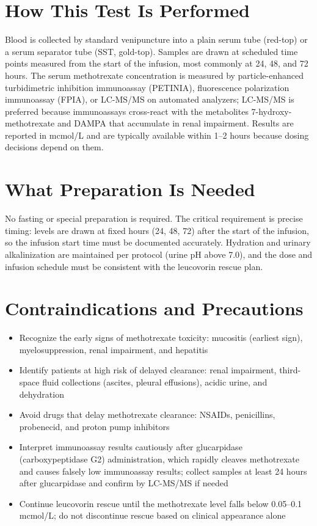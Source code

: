 \section*{How This Test Is Performed}
Blood is collected by standard venipuncture into a plain serum tube (red-top) or a serum separator tube (SST, gold-top). Samples are drawn at scheduled time points measured from the start of the infusion, most commonly at 24, 48, and 72 hours. The serum methotrexate concentration is measured by particle-enhanced turbidimetric inhibition immunoassay (PETINIA), fluorescence polarization immunoassay (FPIA), or LC-MS/MS on automated analyzers; LC-MS/MS is preferred because immunoassays cross-react with the metabolites 7-hydroxy-methotrexate and DAMPA that accumulate in renal impairment. Results are reported in mcmol/L and are typically available within 1--2 hours because dosing decisions depend on them.
\section*{What Preparation Is Needed}
No fasting or special preparation is required. The critical requirement is precise timing: levels are drawn at fixed hours (24, 48, 72) after the start of the infusion, so the infusion start time must be documented accurately. Hydration and urinary alkalinization are maintained per protocol (urine pH above 7.0), and the dose and infusion schedule must be consistent with the leucovorin rescue plan.
\section*{Contraindications and Precautions}
\begin{itemize}
  \item Recognize the early signs of methotrexate toxicity: mucositis (earliest sign), myelosuppression, renal impairment, and hepatitis
  \item Identify patients at high risk of delayed clearance: renal impairment, third-space fluid collections (ascites, pleural effusions), acidic urine, and dehydration
  \item Avoid drugs that delay methotrexate clearance: NSAIDs, penicillins, probenecid, and proton pump inhibitors
  \item Interpret immunoassay results cautiously after glucarpidase (carboxypeptidase G2) administration, which rapidly cleaves methotrexate and causes falsely low immunoassay results; collect samples at least 24 hours after glucarpidase and confirm by LC-MS/MS if needed
  \item Continue leucovorin rescue until the methotrexate level falls below 0.05--0.1 mcmol/L; do not discontinue rescue based on clinical appearance alone
\end{itemize}
